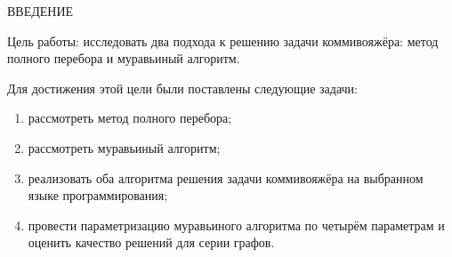 \begin{center}
    \MakeUppercase{Введение}
\end{center}

Цель работы: исследовать два подхода к решению задачи коммивояжёра: метод полного перебора и муравьиный алгоритм.

\vspace{0.25cm}
Для достижения этой цели были поставлены следующие задачи:

\begin{enumerate}[label=\arabic*)]

\item рассмотреть метод полного перебора;

\item рассмотреть муравьиный алгоритм;

\item реализовать оба алгоритма решения задачи коммивояжёра на выбранном языке программирования;

\item провести параметризацию муравьиного алгоритма по четырём параметрам и оценить качество решений для серии графов.

\end{enumerate}

\newpage
